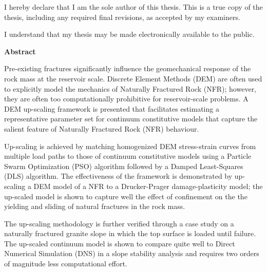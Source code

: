 \cleardoublepage %
 


  \noindent
I hereby declare that I am the sole author of this thesis. This is a true copy of the thesis, including any required final revisions, as accepted by my examiners.

  \bigskip
  
  \noindent
I understand that my thesis may be made electronically available to the public.

\cleardoublepage


\begin{center}\textbf{Abstract}\end{center}

Pre-existing fractures significantly influence the geomechanical response of the rock mass at the reservoir scale.  Discrete Element Methods (DEM) are often used to explicitly model the mechanics of Naturally Fractured Rock (NFR); however, they are often too computationally prohibitive for reservoir-scale problems. A DEM up-scaling framework is presented that facilitates estimating a representative parameter set for continuum constitutive models that capture the salient feature of Naturally Fractured Rock (NFR) behaviour. 

Up-scaling is achieved by matching homogenized DEM stress-strain curves from multiple load paths to those of continuum constitutive models using a Particle Swarm Optimization (PSO) algorithm followed by a Damped Least-Squares (DLS) algorithm. The effectiveness of the framework is demonstrated by up-scaling a DEM model of a NFR to a Drucker-Prager damage-plasticity model; the up-scaled model is shown to capture well the effect of confinement on the the yielding and sliding of natural fractures in the rock mass. 

The up-scaling methodology is further verified through a case study on a naturally fractured granite slope in which the top surface is loaded until failure. The up-scaled continuum model is shown to compare quite well to Direct Numerical Simulation (DNS) in a slope stability analysis and requires two orders of magnitude less computational effort.

